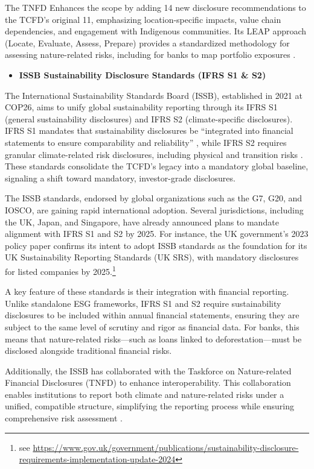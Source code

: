 \documentclass[
  authoryear]{elsarticle}
\providecommand{\tightlist}{%
  \setlength{\itemsep}{0pt}\setlength{\parskip}{0pt}}\usepackage{longtable,booktabs,array}
\begin{document}
The TNFD Enhances the scope by adding 14 new disclosure recommendations
to the TCFD's original 11, emphasizing location-specific impacts, value
chain dependencies, and engagement with Indigenous communities. Its LEAP
approach (Locate, Evaluate, Assess, Prepare) provides a standardized
methodology for assessing nature-related risks, including for banks to
map portfolio exposures \citep[see][]{TNFD2023LEAP}.

\begin{itemize}
\tightlist
\item
  \textbf{ISSB Sustainability Disclosure Standards (IFRS S1 \& S2)}
\end{itemize}

The International Sustainability Standards Board (ISSB), established in
2021 at COP26, aims to unify global sustainability reporting through its
IFRS S1 (general sustainability disclosures) and IFRS S2
(climate-specific disclosures). IFRS S1 mandates that sustainability
disclosures be ``integrated into financial statements to ensure
comparability and reliability'' \citep{IFRS2023S1}, while IFRS S2
requires granular climate-related risk disclosures, including physical
and transition risks \citep{IFRS2023S2}. These standards consolidate the
TCFD's legacy into a mandatory global baseline, signaling a shift toward
mandatory, investor-grade disclosures.

The ISSB standards, endorsed by global organizations such as the G7,
G20, and IOSCO, are gaining rapid international adoption. Several
jurisdictions, including the UK, Japan, and Singapore, have already
announced plans to mandate alignment with IFRS S1 and S2 by 2025. For
instance, the UK government's 2023 policy paper confirms its intent to
adopt ISSB standards as the foundation for its UK Sustainability
Reporting Standards (UK SRS), with mandatory disclosures for listed
companies by 2025.\footnote{see
  \url{https://www.gov.uk/government/publications/sustainability-disclosure-requirements-implementation-update-2024}}

A key feature of these standards is their integration with financial
reporting. Unlike standalone ESG frameworks, IFRS S1 and S2 require
sustainability disclosures to be included within annual financial
statements, ensuring they are subject to the same level of scrutiny and
rigor as financial data. For banks, this means that nature-related
risks---such as loans linked to deforestation---must be disclosed
alongside traditional financial risks.

Additionally, the ISSB has collaborated with the Taskforce on
Nature-related Financial Disclosures (TNFD) to enhance interoperability.
This collaboration enables institutions to report both climate and
nature-related risks under a unified, compatible structure, simplifying
the reporting process while ensuring comprehensive risk assessment
\citep[see][]{TNFD2024}.
\end{document}
